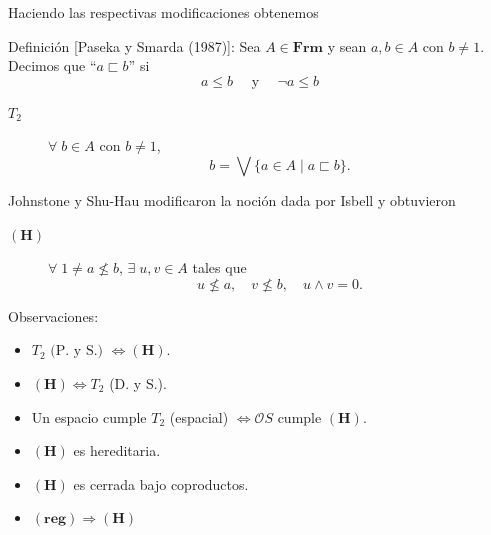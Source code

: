 \documentclass[compress,12pt]{beamer}
\begin{document}
\begin{frame}
    Haciendo las respectivas modificaciones obtenemos

    \begin{block}{Definición [Paseka y Smarda (1987)]:}
        Sea $A\in \mathbf{Frm}$ y sean $a, b\in A$ con $b\neq 1$. Decimos que ``$a\sqsubset b$'' si 
        \[
        a\leq b\quad \mbox{ y }\quad \neg a\leq b
        \]
    \end{block}

    \begin{description}
        \item[$T_2$] $\forall\;b\in A$ con $b\neq 1$,
        \[
        b=\bigvee\{a\in A\mid a\sqsubset b\}.
        \]
    \end{description}
    
\end{frame}

\begin{frame}
    Johnstone y Shu-Hau modificaron la noción dada por Isbell y obtuvieron 

    \begin{description}
        \item[$\mathbf{(H)}$] $\forall\;1\neq a\nleq b$, $\exists\; u, v\in A$ tales que
        \[
        u\nleq a, \quad v\nleq b,\quad u\wedge v=0.
        \]
    \end{description}

    \begin{block}{Observaciones:}
    \begin{itemize}
        \item<3-> $T_2 \mbox{ (P. y S.) } \Leftrightarrow \mathbf{(H)}$.
        \item<4-> $\mathbf{(H)}\Leftrightarrow T_2$ (D. y S.).
        \item<5-> Un espacio cumple $T_2$ (espacial) $\Leftrightarrow \mathcal{O}S$ cumple $\mathbf{(H)}$.
        \item<6-> $\mathbf{(H)}$ es hereditaria.
        \item<7-> $\mathbf{(H)}$ es cerrada bajo coproductos.
        \item<8-> $\mathbf{(reg)}\Rightarrow \mathbf{(H)}$
    \end{itemize}
        
    \end{block}
\end{frame}
\end{document}
